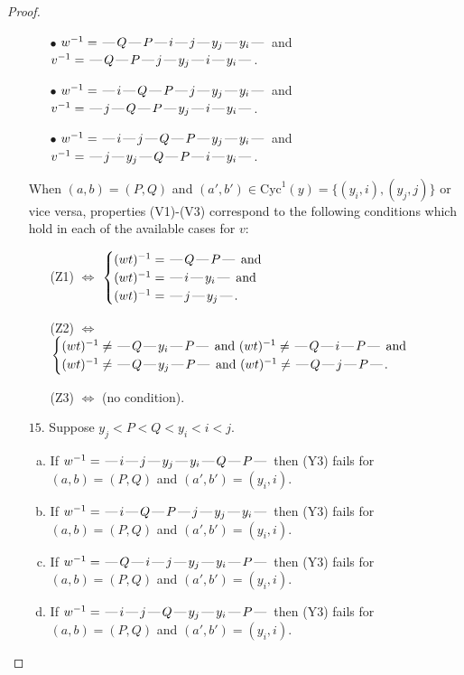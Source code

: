\documentclass[10pt]{article}
\theoremstyle{definition}
\theoremstyle{definition}
\def\dash{\text{\hspace{0.5mm}---\hspace{0.5mm}}}
\def\Cyc{\mathrm{Cyc}}
\begin{document}
\begin{proof}
\begin{enumerate}
\begin{enumerate}
\item[$\bullet$] $w^{-1} = \dash Q\dash P\dash i\dash j\dash y_j\dash y_i\dash $ and $v^{-1} = \dash Q\dash P\dash j\dash y_j\dash i\dash y_i\dash $.
\item[$\bullet$] $w^{-1} = \dash i\dash Q\dash P\dash j\dash y_j\dash y_i\dash $ and $v^{-1} = \dash j\dash Q\dash P\dash y_j\dash i\dash y_i\dash $.
\item[$\bullet$] $w^{-1} = \dash i\dash j\dash Q\dash P\dash y_j\dash y_i\dash $ and $v^{-1} = \dash j\dash y_j\dash Q\dash P\dash i\dash y_i\dash $.
\end{enumerate}
When $(a,b)= (P,Q)$ and $(a',b')\in \Cyc^1(y)=\{(y_i,i),(y_j,j)\}$ or vice versa,
properties (V1)-(V3) correspond to the following conditions which hold in
each of the available cases for $v$:
\begin{enumerate}
\item[](Z1) $\Leftrightarrow$ $\begin{cases}\text{$(wt)^{-1} = \dash Q \dash P \dash$}\text{ and }\\
\text{$(wt)^{-1} = \dash i \dash y_i \dash$}\text{ and }\\
\text{$(wt)^{-1} = \dash j \dash y_j \dash$}.\end{cases}$
\item[](Z2) $\Leftrightarrow$ $\begin{cases}\text{$(wt)^{-1} \neq \dash Q \dash y_i \dash P \dash$ and $(wt)^{-1}\neq \dash Q \dash i \dash P \dash$}\text{ and }\\
\text{$(wt)^{-1} \neq \dash Q \dash y_j \dash P \dash$ and $(wt)^{-1}\neq \dash Q \dash j \dash P \dash$}.\end{cases}$
\item[](Z3) $\Leftrightarrow$ (no condition).
\end{enumerate}
\item[$15$.] Suppose $y_j < P < Q < y_i < i < j$.
\begin{enumerate}[(a)]
\item If $w^{-1} = \dash i\dash j\dash y_j\dash y_i\dash Q\dash P\dash $ then (Y3) fails for $(a,b)=(P,Q)$ and $(a',b')=(y_i,i)$.
\item If $w^{-1} = \dash i\dash Q\dash P\dash j\dash y_j\dash y_i\dash $ then (Y3) fails for $(a,b)=(P,Q)$ and $(a',b')=(y_i,i)$.
\item If $w^{-1} = \dash Q\dash i\dash j\dash y_j\dash y_i\dash P\dash $ then (Y3) fails for $(a,b)=(P,Q)$ and $(a',b')=(y_i,i)$.
\item If $w^{-1} = \dash i\dash j\dash Q\dash y_j\dash y_i\dash P\dash $ then (Y3) fails for $(a,b)=(P,Q)$ and $(a',b')=(y_i,i)$.

\end{enumerate}
\end{enumerate}
\end{proof}
\end{document}
